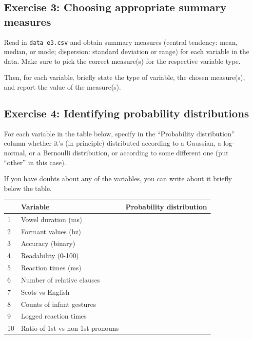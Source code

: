 \documentclass[
]{article}
\begin{document}
\newpage

\hypertarget{exercise-3-choosing-appropriate-summary-measures}{%
\subsection{Exercise 3: Choosing appropriate summary
measures}\label{exercise-3-choosing-appropriate-summary-measures}}

Read in \texttt{data\_e3.csv} and obtain summary measures (central
tendency: mean, median, or mode; dispersion: standard deviation or
range) for each variable in the data. Make sure to pick the correct
measure(s) for the respective variable type.

Then, for each variable, briefly state the type of variable, the chosen
measure(s), and report the value of the measure(s).

\newpage

\hypertarget{exercise-4-identifying-probability-distributions}{%
\subsection{Exercise 4: Identifying probability
distributions}\label{exercise-4-identifying-probability-distributions}}

For each variable in the table below, specify in the ``Probability
distribution'' column whether it's (in principle) distributed according
to a Gaussian, a log-normal, or a Bernoulli distribution, or according
to some different one (put ``other'' in this case).

If you have doubts about any of the variables, you can write about it
briefly below the table.

\begin{longtable}[]{@{}lll@{}}
\toprule()
& Variable & Probability distribution \\
\midrule()
\endhead
1 & Vowel duration (ms) & \\
2 & Formant values (hz) & \\
3 & Accuracy (binary) & \\
4 & Readability (0-100) & \\
5 & Reaction times (ms) & \\
6 & Number of relative clauses & \\
7 & Scots vs English & \\
8 & Counts of infant gestures & \\
9 & Logged reaction times & \\
10 & Ratio of 1st vs non-1st pronouns & \\
\bottomrule()
\end{longtable}
\end{document}
